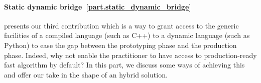 \paragraph{Static dynamic bridge~\ref{part.static_dynamic_bridge}} presents our third contribution which is a way to
grant access to the generic facilities of a compiled language (such as C++) to a dynamic language (such as Python) to
ease the gap between the prototyping phase and the production phase. Indeed, why not enable the practitioner to have
access to production-ready fast algorithm by default? In this part, we discuss some ways of achieving this and offer our
take in the shape of an hybrid solution.

